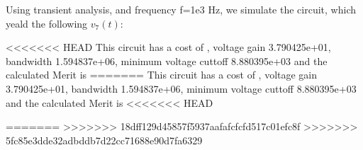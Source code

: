 \par

Using transient analysis, and frequency f=1e3 Hz, we simulate the circuit, which yeald the following $v_7(t)$:




<<<<<<< HEAD
This circuit has a cost of , voltage gain 3.790425e+01, bandwidth 1.594837e+06, minimum voltage cuttoff 8.880395e+03 and the  calculated Merit is 
=======
This circuit has a cost of , voltage gain 3.790425e+01, bandwidth 1.594837e+06, minimum voltage cuttoff 8.880395e+03 and the  calculated Merit is 
<<<<<<< HEAD


=======
>>>>>>> 18dff129d45857f5937aafafcfcfd517c01efc8f
>>>>>>> 5fc85e3dde32adbddb7d22cc71688e90d7fa6329
